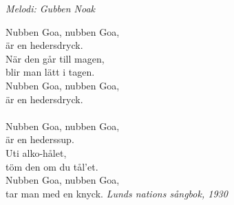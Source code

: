 {\footnotesize\textit{Melodi: Gubben Noak}}\par
\vspace{10pt}
\par
Nubben Goa, nubben Goa,\\
är en hedersdryck.\\
När den går till magen,\\
blir man lätt i tagen.\\
Nubben Goa, nubben Goa,\\
är en hedersdryck.\\
\\
Nubben Goa, nubben Goa,\\
är en hederssup.\\
Uti alko-hålet,\\
töm den om du tål'et.\\
Nubben Goa, nubben Goa,\\
tar man med en knyck.
\vspace{10pt}
{\footnotesize\textit{Lunds nations sångbok, 1930}}

